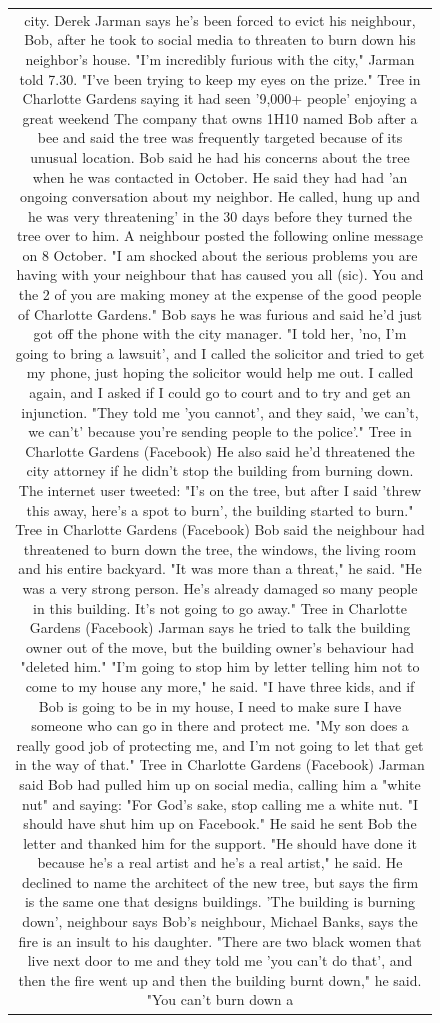 \begin{figure}[H]
\begin{tabular}{c}
{\begin{minipage}{0.9\textwidth}
city.  Derek Jarman says he's been forced to evict his neighbour, Bob, after he took to social media to threaten to burn down his neighbor's house.  "I'm incredibly furious with the city," Jarman told 7.30.  "I've been trying to keep my eyes on the prize."  Tree in Charlotte Gardens saying it had seen '9,000+ people' enjoying a great weekend  The company that owns 1H10 named Bob after a bee and said the tree was frequently targeted because of its unusual location.  Bob said he had his concerns about the tree when he was contacted in October.  He said they had had 'an ongoing conversation about my neighbor. He called, hung up and he was very threatening' in the 30 days before they turned the tree over to him.  A neighbour posted the following online message on 8 October.  "I am shocked about the serious problems you are having with your neighbour that has caused you all (sic). You and the 2 of you are making money at the expense of the good people of Charlotte Gardens."  Bob says he was furious and said he'd just got off the phone with the city manager.  "I told her, 'no, I'm going to bring a lawsuit', and I called the solicitor and tried to get my phone, just hoping the solicitor would help me out. I called again, and I asked if I could go to court and to try and get an injunction.  "They told me 'you cannot', and they said, 'we can't, we can't' because you're sending people to the police'."  Tree in Charlotte Gardens (Facebook)  He also said he'd threatened the city attorney if he didn't stop the building from burning down.  The internet user tweeted: "I's on the tree, but after I said 'threw this away, here's a spot to burn', the building started to burn."  Tree in Charlotte Gardens (Facebook)  Bob said the neighbour had threatened to burn down the tree, the windows, the living room and his entire backyard.  "It was more than a threat," he said.  "He was a very strong person. He's already damaged so many people in this building. It's not going to go away."  Tree in Charlotte Gardens (Facebook)  Jarman says he tried to talk the building owner out of the move, but the building owner's behaviour had "deleted him."  "I'm going to stop him by letter telling him not to come to my house any more," he said.  "I have three kids, and if Bob is going to be in my house, I need to make sure I have someone who can go in there and protect me.  "My son does a really good job of protecting me, and I'm not going to let that get in the way of that."  Tree in Charlotte Gardens (Facebook)  Jarman said Bob had pulled him up on social media, calling him a "white nut" and saying: "For God's sake, stop calling me a white nut.  "I should have shut him up on Facebook."  He said he sent Bob the letter and thanked him for the support.  "He should have done it because he's a real artist and he's a real artist," he said.  He declined to name the architect of the new tree, but says the firm is the same one that designs buildings.  'The building is burning down', neighbour says  Bob's neighbour, Michael Banks, says the fire is an insult to his daughter.  "There are two black women that live next door to me and they told me 'you can't do that', and then the fire went up and then the building burnt down," he said.  "You can't burn down a 
\end{minipage}}
\end{tabular}
\end{figure}
